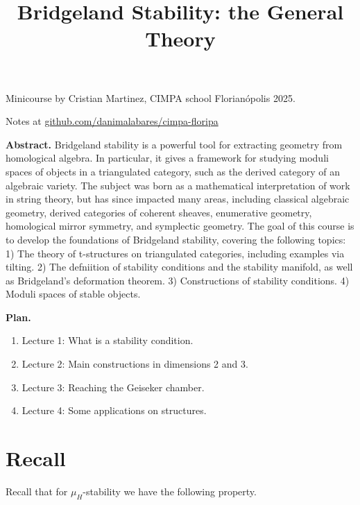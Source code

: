 


\title{Bridgeland Stability: the General Theory}
\maketitle

Minicourse by Cristian Martinez, CIMPA school Florianópolis 2025.

Notes at 
\href{http://github.com/danimalabares/cimpa-floripa}
{github.com/danimalabares/cimpa-floripa}

\bigskip\noindent

{\bf Abstract.} Bridgeland stability is a powerful tool for extracting geometry
from homological algebra. In particular, it gives a framework for studying
moduli spaces of objects in a triangulated category, such as the derived
category of an algebraic variety. The subject was born as a mathematical
interpretation of work in string theory, but has since impacted many areas,
including classical algebraic geometry, derived categories of coherent sheaves,
enumerative geometry, homological mirror symmetry, and symplectic geometry. The
goal of this course is to develop the foundations of Bridgeland stability,
covering the following topics: 1) The theory of t-structures on triangulated
categories, including examples via tilting. 2) The defniition of stability
conditions and the stability manifold, as well as Bridgeland’s deformation
theorem. 3) Constructions of stability conditions. 4) Moduli spaces of stable
objects. 

\bigskip\noindent
\tableofcontents
\bigskip\noindent

\noindent
{\bf Plan.}
\begin{enumerate}
\item Lecture 1: What is a stability condition.
\item Lecture 2: Main constructions in dimensions 2 and 3.
\item Lecture 3: Reaching the Geiseker chamber.
\item Lecture 4: Some applications on structures.
\end{enumerate}

\section{Recall}
\label{section-recall}

Recall that for $\mu_H$-stability we have the following property.

